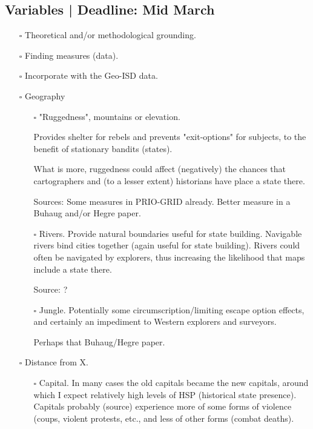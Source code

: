 \documentclass[12pt]{article}
\begin{document}
\subsection{Variables | Deadline: Mid March}
\begin{itemize}
	\item[$\square$] Theoretical and/or methodological grounding.

	\item[$\square$] Finding measures (data).

	\item[$\square$] Incorporate with the Geo-ISD data.

	\item[$\square$] Geography
	\begin{itemize}
		\item[$\square$] "Ruggedness", mountains or elevation.

			Provides shelter for rebels and prevents "exit-options"
			for subjects, to the benefit of stationary bandits
			(states).

			What is more, ruggedness could affect (negatively) the
			chances that cartographers and (to a lesser extent)
			historians have place a state there.
			
			Sources: Some measures in PRIO-GRID already. Better
			measure in a Buhaug and/or Hegre paper.


		\item[$\square$] Rivers.
			Provide natural boundaries useful for state building.
			Navigable rivers bind cities together (again useful for
			state building). Rivers could often be navigated by
			explorers, thus increasing the likelihood that maps
			include a state there.

			Source: ? 

		\item[$\square$] Jungle. Potentially some
			circumscription/limiting escape option effects, and
			certainly an impediment to Western explorers and
			surveyors.

			Perhaps that Buhaug/Hegre paper.
	\end{itemize}

	\item[$\square$] Distance from X.
	\begin{itemize}
		\item[$\square$] Capital. In many cases the old capitals became
			the new capitals, around which I expect relatively high
			levels of HSP (historical state presence). Capitals
			probably (source) experience more of some forms of
			violence (coups, violent protests, etc., and less of
			other forms (combat deaths).


\end{itemize}
\end{itemize}
\end{document}
